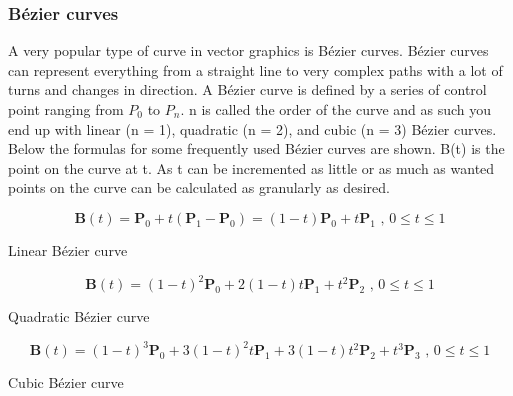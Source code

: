 \subsubsection{Bézier curves}

A very popular type of curve in vector graphics is Bézier curves.
Bézier curves can represent everything from a straight line to very complex paths with a lot of turns and changes in direction.
A Bézier curve is defined by a series of control point ranging from \(P_0\) to \(P_n\). 
n is called the order of the curve and as such you end up with linear (n = 1), quadratic (n = 2), and cubic (n = 3) Bézier curves.
Below the formulas for some frequently used Bézier curves are shown. B(t) is the point on the curve at t.
As t can be incremented as little or as much as wanted points on the curve can be calculated as granularly as desired.

\begin{cequation}[H]
	\begin{equation*}
		\mathbf{B}(t)=\mathbf{P}_0 + t(\mathbf{P}_1-\mathbf{P}_0)=(1-t)\mathbf{P}_0 + t\mathbf{P}_1 \mbox{ , } 0 \le t \le 1
	\end{equation*}
	\caption{Linear Bézier curve}
\end{cequation}

\begin{cequation}[H]
	\begin{equation*}
		\mathbf{B}(t) = (1 - t)^{2}\mathbf{P}_0 + 2(1 - t)t\mathbf{P}_1 + t^{2}\mathbf{P}_2 \mbox{ , } 0 \le t \le 1
	\end{equation*}
	\caption{Quadratic Bézier curve}
\end{cequation}

\begin{cequation}[H]
	\begin{equation*}
		\mathbf{B}(t)=(1-t)^3\mathbf{P}_0+3(1-t)^2t\mathbf{P}_1+3(1-t)t^2\mathbf{P}_2+t^3\mathbf{P}_3 \mbox{ , } 0 \le t \le 1
	\end{equation*}
	\caption{Cubic Bézier curve}
\end{cequation}
